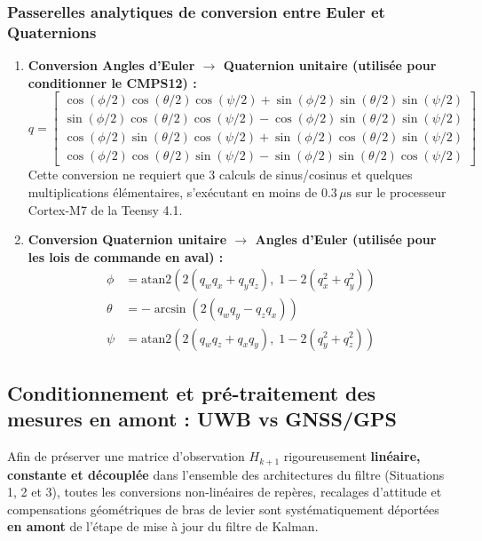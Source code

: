 \documentclass[../Formulations_Kalman.tex]{subfiles}
\begin{document}
\subsubsection{Passerelles analytiques de conversion entre Euler et Quaternions}
\begin{enumerate}
    \item \textbf{Conversion Angles d'Euler $\to$ Quaternion unitaire (utilisée pour conditionner le CMPS12) :}
    \begin{equation}
    q = \begin{bmatrix}
    \cos(\phi/2)\cos(\theta/2)\cos(\psi/2) + \sin(\phi/2)\sin(\theta/2)\sin(\psi/2) \\
    \sin(\phi/2)\cos(\theta/2)\cos(\psi/2) - \cos(\phi/2)\sin(\theta/2)\sin(\psi/2) \\
    \cos(\phi/2)\sin(\theta/2)\cos(\psi/2) + \sin(\phi/2)\cos(\theta/2)\sin(\psi/2) \\
    \cos(\phi/2)\cos(\theta/2)\sin(\psi/2) - \sin(\phi/2)\sin(\theta/2)\cos(\psi/2)
    \end{bmatrix}
    \end{equation}
    Cette conversion ne requiert que 3 calculs de sinus/cosinus et quelques multiplications élémentaires, s'exécutant en moins de $0.3\,\mu\text{s}$ sur le processeur Cortex-M7 de la Teensy 4.1.
    
    \item \textbf{Conversion Quaternion unitaire $\to$ Angles d'Euler (utilisée pour les lois de commande en aval) :}
    \begin{align}
    \phi &= \text{atan2}\left(2(q_w q_x + q_y q_z), \; 1 - 2(q_x^2 + q_y^2)\right) \\
    \theta &= -\arcsin\left(2(q_w q_y - q_z q_x)\right) \\
    \psi &= \text{atan2}\left(2(q_w q_z + q_x q_y), \; 1 - 2(q_y^2 + q_z^2)\right)
    \end{align}
\end{enumerate}

\subsection{Conditionnement et pré-traitement des mesures en amont : UWB vs GNSS/GPS}
Afin de préserver une matrice d'observation $H_{k+1}$ rigoureusement \textbf{linéaire, constante et découplée} dans l'ensemble des architectures du filtre (Situations 1, 2 et 3), toutes les conversions non-linéaires de repères, recalages d'attitude et compensations géométriques de bras de levier sont systématiquement déportées \textbf{en amont} de l'étape de mise à jour du filtre de Kalman.
\end{document}
